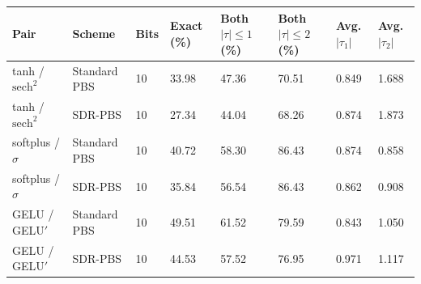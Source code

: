\footnotesize
\setlength{\tabcolsep}{4pt}
\renewcommand{\arraystretch}{1.08}
\begin{tabular}{llllllll}
\toprule
Pair & Scheme & Bits & Exact (\%) & Both $|\tau|\leq 1$ (\%) & Both $|\tau|\leq 2$ (\%) & Avg. $|\tau_1|$ & Avg. $|\tau_2|$ \\
\midrule
tanh / $\mathrm{sech}^2$ & Standard PBS & 10 & 33.98 & 47.36 & 70.51 & 0.849 & 1.688 \\
tanh / $\mathrm{sech}^2$ & SDR-PBS & 10 & 27.34 & 44.04 & 68.26 & 0.874 & 1.873 \\
softplus / $\sigma$ & Standard PBS & 10 & 40.72 & 58.30 & 86.43 & 0.874 & 0.858 \\
softplus / $\sigma$ & SDR-PBS & 10 & 35.84 & 56.54 & 86.43 & 0.862 & 0.908 \\
GELU / GELU$'$ & Standard PBS & 10 & 49.51 & 61.52 & 79.59 & 0.843 & 1.050 \\
GELU / GELU$'$ & SDR-PBS & 10 & 44.53 & 57.52 & 76.95 & 0.971 & 1.117 \\
\bottomrule
\end{tabular}

